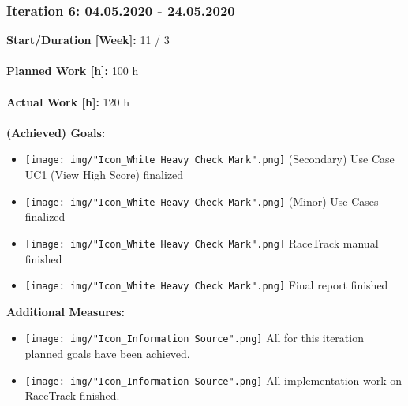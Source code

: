 			\subsubsection{Iteration 6: 04.05.2020 - 24.05.2020}
				\textbf{Start/Duration [Week]:} 11 / 3 \\~\\
				\textbf{Planned Work [h]:} 100 h \\~\\
				\textbf{Actual Work [h]:} 120 h \\~\\
				\textbf{(Achieved) Goals:}
				\begin{itemize}
					\item \texttt{[image: img/"Icon\_White Heavy Check Mark".png]} (Secondary) Use Case UC1 (View High Score) finalized
					\item \texttt{[image: img/"Icon\_White Heavy Check Mark".png]} (Minor) Use Cases finalized
					\item \texttt{[image: img/"Icon\_White Heavy Check Mark".png]} RaceTrack manual finished
					\item \texttt{[image: img/"Icon\_White Heavy Check Mark".png]} Final report finished
				\end{itemize}
				\textbf{Additional Measures:}
				\begin{itemize}
					\item \texttt{[image: img/"Icon\_Information Source".png]} All for this iteration planned goals have been achieved.
					\item \texttt{[image: img/"Icon\_Information Source".png]} All implementation work on RaceTrack finished.
				\end{itemize}


